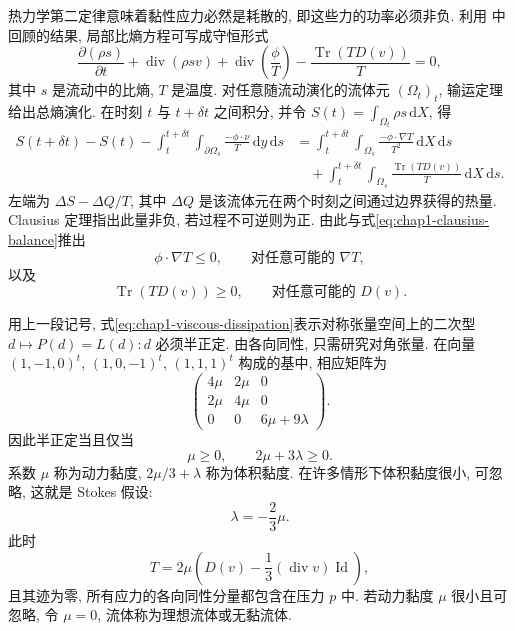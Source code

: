 热力学第二定律意味着黏性应力必然是耗散的, 即这些力的功率必须非负. 利用 中回顾的结果, 局部比熵方程可写成守恒形式
\[
  \frac{\partial(\rho s)}{\partial t}+\operatorname{div}(\rho sv)
  +\operatorname{div}\left(\frac{\phi}{T}\right)-\frac{\operatorname{Tr}(T D(v))}{T}=0,
\]
其中 $s$ 是流动中的比熵, $T$ 是温度. 对任意随流动演化的流体元 $(\Omega_t)_t$, 输运定理给出总熵演化. 在时刻 $t$ 与 $t+\delta t$ 之间积分, 并令 $S(t)=\int_{\Omega_t}\rho s\,\mathrm{d}X$, 得
\begin{equation}
\label{eq:chap1-clausius-balance}
\begin{aligned}
S(t+\delta t)-S(t)-\int_t^{t+\delta t}\int_{\partial\Omega_s}\frac{-\phi\cdot\nu}{T}\,\mathrm{d}y\,\mathrm{d}s
&=\int_t^{t+\delta t}\int_{\Omega_s}\frac{-\phi\cdot\nabla T}{T^2}\,\mathrm{d}X\,\mathrm{d}s\\
&\quad+\int_t^{t+\delta t}\int_{\Omega_s}\frac{\operatorname{Tr}(T D(v))}{T}\,\mathrm{d}X\,\mathrm{d}s.
\end{aligned}
\end{equation}
左端为 $\Delta S-\Delta Q/T$, 其中 $\Delta Q$ 是该流体元在两个时刻之间通过边界获得的热量. Clausius 定理指出此量非负, 若过程不可逆则为正. 由此与式\eqref{eq:chap1-clausius-balance}推出
\begin{equation}
\label{eq:chap1-heat-flux-dissipation}
  \phi\cdot\nabla T\leq0,\qquad\text{对任意可能的 $\nabla T$},
\end{equation}
以及
\begin{equation}
\label{eq:chap1-viscous-dissipation}
  \operatorname{Tr}(T D(v))\geq0,\qquad\text{对任意可能的 $D(v)$}.
\end{equation}

用上一段记号, 式\eqref{eq:chap1-viscous-dissipation}表示对称张量空间上的二次型 $d\mapsto P(d)=L(d):d$ 必须半正定. 由各向同性, 只需研究对角张量. 在向量 $(1,-1,0)^t$, $(1,0,-1)^t$, $(1,1,1)^t$ 构成的基中, 相应矩阵为
\[
  \begin{pmatrix}4\mu&2\mu&0\\2\mu&4\mu&0\\0&0&6\mu+9\lambda\end{pmatrix}.
\]
因此半正定当且仅当
\begin{equation}
\label{eq:chap1-viscosity-conditions}
  \mu\geq0,\qquad 2\mu+3\lambda\geq0.
\end{equation}
系数 $\mu$ 称为动力黏度, $2\mu/3+\lambda$ 称为体积黏度. 在许多情形下体积黏度很小, 可忽略, 这就是 Stokes 假设:
\begin{equation}
\label{eq:chap1-stokes-hypothesis}
  \lambda=-\frac23\mu.
\end{equation}
此时
\[
  T=2\mu\left(D(v)-\frac13(\operatorname{div}v)\operatorname{Id}\right),
\]
且其迹为零, 所有应力的各向同性分量都包含在压力 $p$ 中. 若动力黏度 $\mu$ 很小且可忽略, 令 $\mu=0$, 流体称为理想流体或无黏流体.

